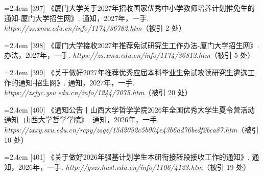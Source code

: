 {\vspace{0.6pt}
\noindent\hangindent=2.4em \label{src:S0531}{\color{cAccent}[397]} 《厦门大学关于2027年招收国家优秀中小学教师培养计划推免生的通知-厦门大学招生网》. 通知，2027年，一手. \textit{https://zs.xmu.edu.cn/info/1174/36782.htm}（被引 2 处）\par
\vspace{0.6pt}
\noindent\hangindent=2.4em \label{src:S0532}{\color{cAccent}[398]} 《厦门大学接收2027年推荐免试研究生工作办法-厦门大学招生网》. 办法，2027年，一手. \textit{https://zs.xmu.edu.cn/info/1174/36812.htm}（被引 5 处）\par
\vspace{0.6pt}
\vspace{3.5pt}\par
\nopagebreak\vspace{1pt}
\noindent\hangindent=2.4em \label{src:S0533}{\color{cAccent}[399]} 《关于做好2027年推荐优秀应届本科毕业生免试攻读研究生遴选工作的通知-招生网》. 通知，2027年，一手. \textit{https://zsjyc.ysu.edu.cn/info/1244/7075.htm}（被引 20 处）\par
\vspace{0.6pt}
\vspace{3.5pt}\par
\nopagebreak\vspace{1pt}
\noindent\hangindent=2.4em \label{src:S0534}{\color{cAccent}[400]} 《通知公告丨山西大学哲学学院2026年全国优秀大学生夏令营活动通知\_山西大学哲学学院》. 通知，2026年，一手. \textit{https://zxxy.sxu.edu.cn/rcpy/zsgz/15d2092c5b004e43b6ad76bedf2bca87.htm}（被引 10 处）\par
\vspace{0.6pt}
\vspace{3.5pt}\par
\nopagebreak\vspace{1pt}
\noindent\hangindent=2.4em \label{src:S0536}{\color{cAccent}[401]} 《关于做好2026年强基计划学生本研衔接转段接收工作的通知》. 通知，2026年，一手. \textit{http://gszs.hust.edu.cn/info/1106/4123.htm}（被引 19 处）\par
\vspace{0.6pt}
\vspace{3.5pt}\par
\nopagebreak\vspace{1pt}
}
